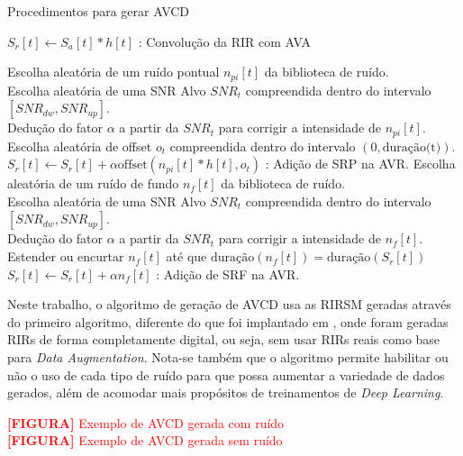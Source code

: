 \begin{algorithm} [H] 
    \caption{Procedimentos para gerar AVCD}
    \label{alg:AVCD-gen}


    $S_r[t] \gets S_a[t] \ast h[t]$ : Convolução da RIR com AVA

    {
        {
            Escolha aleatória de um ruído pontual $n_{pi}[t]$ da biblioteca de ruído. \\
            Escolha aleatória de uma SNR Alvo $SNR_t$ compreendida dentro do intervalo $[SNR_{dw},SNR_{up}]$. \\
            Dedução do fator $\alpha$ a partir da $SNR_t$ para corrigir a intensidade de $n_{pi}[t]$. \\
            Escolha aleatória de offset $o_t$ compreendida dentro do intervalo $(0,\text{duração(t)})$. \\
            $S_r[t] \gets S_r[t] + \alpha \text{offset}(n_{pi}[t] \ast h[t], o_t)$ : Adição de SRP na AVR.
        }
    }
    {
        Escolha aleatória de um ruído de fundo $n_f[t]$ da biblioteca de ruído. \\
        Escolha aleatória de uma SNR Alvo $SNR_t$ compreendida dentro do intervalo $[SNR_{dw},SNR_{up}]$. \\
        Dedução do fator $\alpha$ a partir da $SNR_t$ para corrigir a intensidade de $n_f[t]$. \\
        Estender ou encurtar $n_f[t]$ até que $\text{duração}(n_f[t]) = \text{duração}(S_r[t])$
        $S_r[t] \gets S_r[t] + \alpha n_f[t]$ : Adição de SRF na AVR.
    }

\end{algorithm}
\pagebreak


Neste trabalho, o algoritmo de geração de AVCD usa as RIRSM geradas através do primeiro algoritmo, diferente do que foi implantado
em \cite{Speech_Rec}, onde foram geradas RIRs de forma completamente digital, ou seja, sem usar RIRs reais como base para \textit{Data Augmentation}.
Nota-se também que o algoritmo permite habilitar ou não o uso de cada tipo de ruído para que possa aumentar a variedade de dados gerados, além
de acomodar mais propósitos de treinamentos de \textit{Deep Learning}.


\noindent
\textcolor{red}{\textbf{[FIGURA]} Exemplo de AVCD gerada com ruído} \\ 
\textcolor{red}{\textbf{[FIGURA]} Exemplo de AVCD gerada sem ruído} 